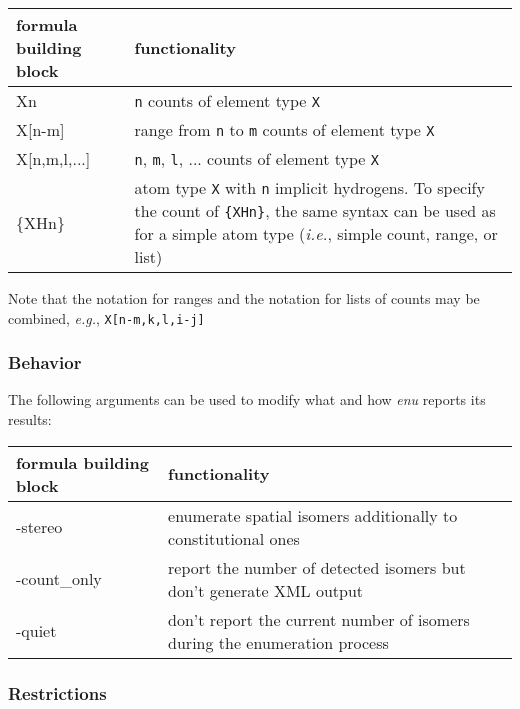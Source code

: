 \documentclass[a4paper,11pt]{article}
\begin{document}
\begin{table}[H]
\begin{tabular}{>{\ttfamily\raggedright}p{}|p{}}
    \hline
    \textnormal{formula building block} & functionality \\
    \hline\hline
    Xn           & \texttt{n} counts of element type \texttt{X} \\
    X[n-m]       & range from \texttt{n} to \texttt{m} counts of element type \texttt{X}\\
    X[n,m,l,...] & \texttt{n}, \texttt{m}, \texttt{l}, ... counts of element type \texttt{X} \\
    \{XHn\}      & atom type \texttt{X} with \texttt{n} implicit hydrogens. To specify the count of \texttt{\{XHn\}}, the same syntax can be used as for a simple atom type (\textit{i.e.}, simple count, range, or list) \\
    \hline
\end{tabular}
\end{table}

Note that the notation for ranges and the notation for lists of counts may be combined, \textit{e.g.}, \texttt{X[n-m,k,l,i-j]}

\subsubsection{Behavior}

The following arguments can be used to modify what and how \textit{enu} reports its results:

\begin{table}[H]
\begin{tabular}{>{\ttfamily\raggedright}p{}|p{}}
    \hline
    \textnormal{formula building block} & functionality \\
    \hline\hline
    -stereo & enumerate spatial isomers additionally to constitutional ones\\
    \hline
    -count\_only & report the number of detected isomers but don't generate XML output\\
    \hline
    -quiet & don't report the current number of isomers during the enumeration process\\
    \hline
\end{tabular}
\end{table}

\subsubsection{Restrictions}\label{sec:restrictions}
\end{document}

